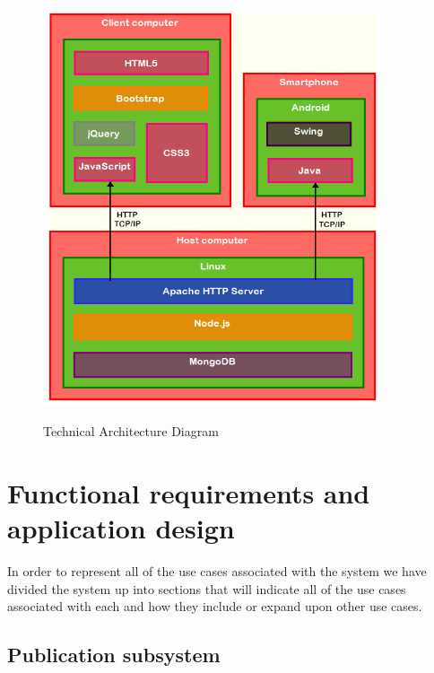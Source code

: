 \documentclass{article}
\begin{document}
\begin{figure}[H]
	\begin{center}
    	\includegraphics[width=10cm]{Ruan_Diagrams/technical_architecture.png}  \\
	\end{center}
	\caption{Technical Architecture Diagram}
\end{figure}

\newpage

\section{Functional requirements and application design}
In order to represent all of the use cases associated with the system we have divided the system up into sections that will indicate all of the use cases associated with each and how they include or expand upon other use cases.
	
\subsection{Publication subsystem} 
\end{document}
